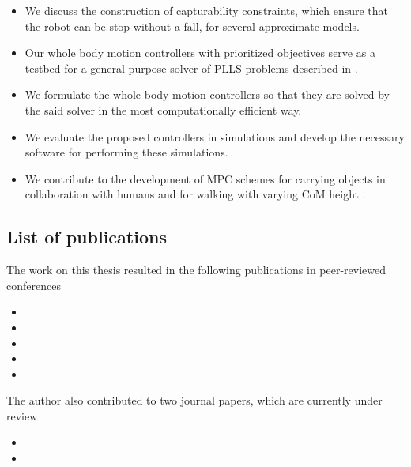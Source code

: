 \begin{itemize}
\begin{itemize}
            \item We discuss the construction of capturability constraints,
                which ensure that the robot can be stop without a fall, for
                several approximate models.

            \item Our whole body motion controllers with prioritized objectives
                serve as a testbed for a general purpose solver of \acf{PLLS}
                problems described in \cite{Dimitrov2015preprint}.

            \item We formulate the whole body motion controllers so that they
                are solved by the said solver in the most computationally
                efficient way.

            \item We evaluate the proposed controllers in simulations and
                develop the necessary software for performing these
                simulations.

            \item We contribute to the development of \ac{MPC} schemes for
                carrying objects in collaboration with humans
                \cite{Agravante2016icra} and for walking with varying \ac{CoM}
                height \cite{Brasseur2015humanoids}.
        \end{itemize}
\end{itemize}


\subsection{List of publications}

The work on this thesis resulted in the following publications in peer-reviewed
conferences
%
\begin{itemize}
    \item {}
    \item {}
    \item {}
    \item {}
    \item {}
\end{itemize}
%

The author also contributed to two journal papers, which are currently under
review
%
\begin{itemize}
    \item {}
    \item {}
\end{itemize}
%


